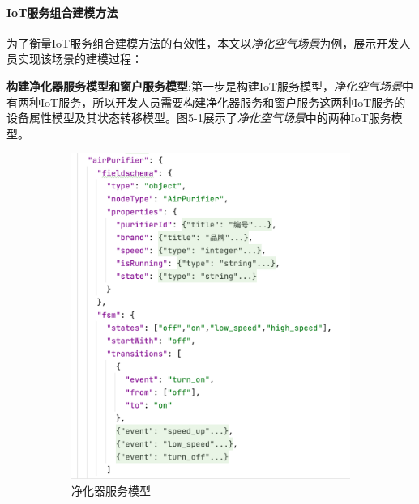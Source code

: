 \documentclass[winfonts,master,twoside]{njuthesis}
\begin{document}
\paragraph{IoT服务组合建模方法}
为了衡量IoT服务组合建模方法的有效性，本文以\textit{净化空气场景}为例，展示开发人员实现该场景的建模过程：

\textbf{构建净化器服务模型和窗户服务模型}:第一步是构建IoT服务模型，\textit{净化空气场景}中有两种IoT服务，所以开发人员需要构建净化器服务和窗户服务这两种IoT服务的设备属性模型及其状态转移模型。图5-1展示了\textit{净化空气场景}中的两种IoT服务模型。
\begin{figure}[H]
	\begin{subfigure}{.5\textwidth}
		\centering
		\includegraphics[width=1.0\textwidth]{figure/5-experiment/purifier-model.png}
		\caption{净化器服务模型}
		\label{subfig:a}
	\end{subfigure}
	\begin{subfigure}{.5\textwidth}
		\centering

\end{subfigure}
\end{figure}
\end{document}
